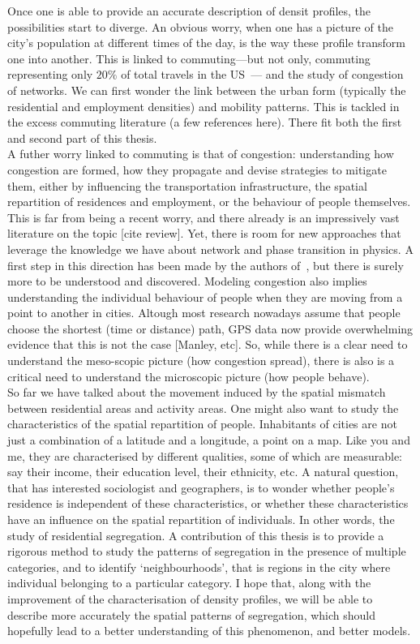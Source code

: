 Once one is able to provide an accurate description of densit profiles, the
possibilities start to diverge. An obvious worry, when one has a picture of the
city's population at different times of the day, is the way these profile
transform one into another. This is linked to commuting---but not only,
commuting representing only $20\%$ of total travels in the
US~\cite{FHWA-PL-11-022}--- and the study of congestion of networks. We can
first wonder the link between the urban form (typically the residential and
employment densities) and mobility patterns. This is tackled in the excess
commuting literature (a few references here). There fit both the first and
second part of this thesis.\\ A futher worry linked to commuting is that of
congestion: understanding how congestion are formed, how they propagate and
devise strategies to mitigate them, either by influencing the transportation
infrastructure, the spatial repartition of residences and employment, or the
behaviour of people themselves.  This is far from being a recent worry, and
there already is an impressively vast literature on the topic [cite review].
Yet, there is room for new approaches that leverage the knowledge we have about
network and phase transition in physics. A first step in this direction has been
made by the authors of~\cite{Daqing:2015}, but there is surely more to be
understood and discovered.  Modeling congestion also implies understanding the
individual behaviour of people when they are moving from a point to another in
cities. Altough most research nowadays assume that people choose the shortest
(time or distance) path, GPS data now provide overwhelming evidence that this is
not the case [Manley, etc]. So, while there is a clear need to understand the
meso-scopic picture (how congestion spread), there is also is a critical need to
understand the microscopic picture (how people behave).\\

So far we have talked about the movement induced by the spatial mismatch between
residential areas and activity areas. One might also want to study the
characteristics of the spatial repartition of people. Inhabitants of cities are
not just a combination of a latitude and a longitude, a point on a map. Like you
and me, they are characterised by different qualities, some of which are
measurable: say their income, their education level, their ethnicity, etc. A
natural question, that has interested sociologist and geographers, is to wonder
whether people's residence is independent of these characteristics, or whether
these characteristics have an influence on the spatial repartition of
individuals. In other words, the study of residential segregation. A
contribution of this thesis is to provide a rigorous method to study the
patterns of segregation in the presence of multiple categories, and to identify
`neighbourhoods', that is regions in the city where individual belonging to a
particular category. I hope that, along with the improvement of the
characterisation of density profiles, we will be able to describe more
accurately the spatial patterns of segregation, which should hopefully lead to a
better understanding of this phenomenon, and better models.\\

